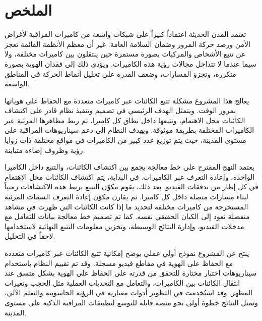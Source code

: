 \chapter*{الملخص}
\setlength{\parindent}{0pt}
\setlength{\parskip}{0.8em}

تعتمد المدن الحديثة اعتماداً كبيراً على شبكات واسعة من كاميرات المراقبة لأغراض الأمن ورصد حركة المرور وضمان السلامة العامة. غير أن معظم الأنظمة القائمة تعجز عن تتبع الأشخاص والمركبات بصورة مستمرة حين ينتقلون بين كاميرات مختلفة، ولا سيما عندما لا تتداخل مجالات رؤية هذه الكاميرات. ويؤدي ذلك إلى فقدان الهوية بصورة متكررة، وتجزؤ المسارات، وضعف القدرة على تحليل أنماط الحركة في المناطق الواسعة.

يعالج هذا المشروع مشكلة تتبع الكائنات عبر كاميرات متعددة مع الحفاظ على هوياتها بمرور الوقت. ويتمثل الهدف الرئيسي في تصميم وتنفيذ نظام قادر على اكتشاف الكائنات محل الاهتمام، وتتبعها داخل نطاق كل كاميرا، ثم ربط مظاهرها المرئية عبر الكاميرات المختلفة بطريقة موثوقة. ويهدف النظام إلى دعم سيناريوهات المراقبة على مستوى المدينة، حيث يتم توزيع عدد كبير من الكاميرات في مواقع مختلفة ذات زوايا رؤية وظروف إضاءة متباينة.

يعتمد النهج المقترح على خط معالجة يجمع بين اكتشاف الكائنات، والتتبع داخل الكاميرا الواحدة، وإعادة التعرف عبر الكاميرات. في البداية، يتم اكتشاف الكائنات محل الاهتمام في كل إطار من تدفقات الفيديو. بعد ذلك، يقوم مكوّن التتبع بربط هذه الاكتشافات زمنياً لبناء مسارات متصلة داخل كل كاميرا. ثم يقارن مكوّن إعادة التعرف السمات المرئية المستخرجة من كاميرات مختلفة لتحديد ما إذا كانت الكائنات التي ظهرت في مشاهد منفصلة تعود إلى الكيان الحقيقي نفسه. كما تم تصميم خط معالجة بيانات للتعامل مع مدخلات الفيديو، وإدارة النتائج الوسيطة، وتخزين معلومات التتبع النهائية لاستخدامها لاحقاً في التحليل.

ينتج عن المشروع نموذج أولي عملي يوضح إمكانية تتبع الكائنات عبر كاميرات متعددة مع الحفاظ على الهوية في مقاطع فيديو مسجلة. وقد تم تقييم النظام باستخدام سيناريوهات اختبار مختارة للتحقق من قدرته على الحفاظ على الهوية بشكل متسق عند انتقال الكائنات بين الكاميرات، والتعامل مع التحديات العملية مثل الحجب وتغيرات المظهر. وقد استُخدمت في التطوير أدوات معيارية في الرؤية الحاسوبية والتعلم الآلي، وتمثل النتائج خطوة أولى نحو منصة قابلة للتوسع لتطبيقات المراقبة الذكية على مستوى المدينة.